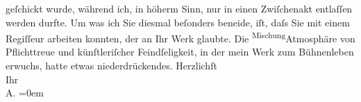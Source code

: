 \begin{ledgroupsized}[t]{13cm}
               geſchickt wurde, während ich, in höherm Sinn, nur in einen Zwiſchenakt entlaſſen
               werden durfte. Um was ich Sie diesmal beſonders beneide, iſt, daſs Sie mit einem Regiſſeur arbeiten konnten, der
               an Ihr Werk glaubte. Die \substVorne{}\textsuperscript{Mischung}{\allowbreak}\substDazwischen{}Atmosphäre\substHinten{} von Pflichttreue und künſtleriſcher Feindſeligkeit, in der  mein Werk zum Bühnenleben erwuchs, hatte {\pb}etwas niederdrückendes.\pend
           \pstart
           Herzlichſt{\\[\baselineskip]}Ihr{\\[\baselineskip]}\spacefill\mbox{A.}\pend
           \leftskip=0em{}\endnumbering{}\end{ledgroupsized}  \newcommand{\dateiname}{L01587}\newcommand{\titel}{Arthur Schnitzler an Hugo von Hofmannsthal, 6. 3. 1906}\newcommand{\editorInnen}{Martin Anton Müller und Gerd-Hermann Susen}
      